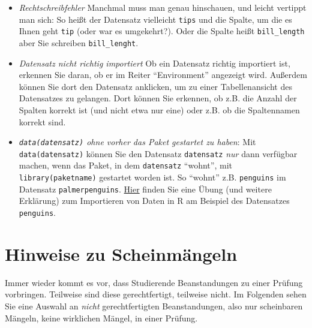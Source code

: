 \documentclass[
  a4paper,
  DIV=11]{scrreprt}
\providecommand{\tightlist}{%
  \setlength{\itemsep}{0pt}\setlength{\parskip}{0pt}}\usepackage{longtable,booktabs,array}
\theoremstyle{definition}
\theoremstyle{remark}
\begin{document}
\begin{itemize}
\tightlist
\item
  \emph{Rechtschreibfehler} Manchmal muss man genau hinschauen, und
  leicht vertippt man sich: So heißt der Datensatz vielleicht
  \texttt{tips} und die Spalte, um die es Ihnen geht \texttt{tip} (oder
  war es umgekehrt?). Oder die Spalte heißt \texttt{bill\_length} aber
  Sie schreiben \texttt{bill\_lenght}.
\item
  \emph{Datensatz nicht richtig importiert} Ob ein Datensatz richtig
  importiert ist, erkennen Sie daran, ob er im Reiter ``Environment''
  angezeigt wird. Außerdem können Sie dort den Datensatz anklicken, um
  zu einer Tabellenansicht des Datensatzes zu gelangen. Dort können Sie
  erkennen, ob z.B. die Anzahl der Spalten korrekt ist (und nicht etwa
  nur eine) oder z.B. ob die Spaltennamen korrekt sind.
\item
  \emph{\texttt{data(datensatz)} ohne vorher das Paket gestartet zu
  haben}: Mit \texttt{data(datensatz)} können Sie den Datensatz
  \texttt{datensatz} \emph{nur} dann verfügbar machen, wenn das Paket,
  in dem \texttt{datensatz} ``wohnt'', mit \texttt{library(paketname)}
  gestartet worden ist. So ``wohnt'' z.B. \texttt{penguins} im Datensatz
  \texttt{palmerpenguins}.
  \href{https://datenwerk.netlify.app/post/pfad/pfad/}{Hier} finden Sie
  eine Übung (und weitere Erklärung) zum Importieren von Daten in R am
  Beispiel des Datensatzes \texttt{penguins}.
\end{itemize}

\hypertarget{hinweise-zu-scheinmuxe4ngeln}{%
\section{Hinweise zu Scheinmängeln}\label{hinweise-zu-scheinmuxe4ngeln}}

Immer wieder kommt es vor, dass Studierende Beanstandungen zu einer
Prüfung vorbringen. Teilweise sind diese gerechtfertigt, teilweise
nicht. Im Folgenden sehen Sie eine Auswahl an \emph{nicht}
gerechtfertigten Beanstandungen, also nur scheinbaren Mängeln, keine
wirklichen Mängel, in einer Prüfung.
\end{document}
